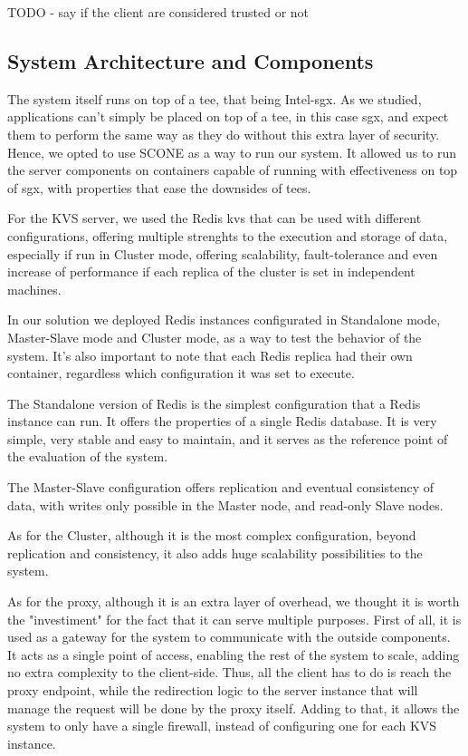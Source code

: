 TODO - say if the client are considered trusted or not


\subsection{System Architecture and Components}

The system itself runs on top of a \gls{tee}, that being Intel-\gls{sgx}. As we studied, applications can't simply be placed on top of a \gls{tee}, in this case \gls{sgx}, and expect them to perform the same way as they do without this extra layer of security. 
Hence, we opted to use SCONE \cite{ssec:scone} as a way to run our system. It allowed us to run the server components on containers capable of running with effectiveness on top of \gls{sgx}, with properties that ease the downsides of \gls{tee}s. 

For the KVS server, we used the Redis \gls{kvs} that can be used with different configurations, offering multiple strenghts to the execution and storage of data, especially if run in Cluster mode, offering scalability, fault-tolerance and even increase of performance if each replica of the cluster is set in independent machines.
 
In our solution we deployed Redis instances configurated in Standalone mode, Master-Slave mode and Cluster mode, as a way to test the behavior of the system. It's also important to note that each Redis replica had their own container, regardless which configuration it was set to execute. 

The Standalone version of Redis is the simplest configuration that a Redis instance can run. It offers the properties of a single Redis database. It is very simple, very stable and easy to maintain, and it serves as the reference point of the evaluation of the system.

The Master-Slave configuration offers replication and eventual consistency of data, with writes only possible in the Master node, and read-only Slave nodes.

As for the Cluster, although it is the most complex configuration, beyond replication and consistency, it also adds huge scalability possibilities to the system.


As for the proxy, although it is an extra layer of overhead, we thought it is worth the "investiment" for the fact that it can serve multiple purposes. 
First of all, it is used as a gateway for the system to communicate with the outside components.  It acts as a single point of access, enabling the rest of the system to scale, adding no extra complexity to the client-side. Thus, all the client has to do is reach the proxy endpoint, while the redirection logic to the server instance that will manage the request will be done by the proxy itself. Adding to that, it allows the system to only have a single firewall, instead of configuring one for each KVS instance.

